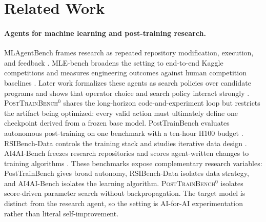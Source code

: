 \documentclass{article}
\newcommand{\bench}{\textsc{PostTrainBench}$^{0}$}
\begin{document}
\section{Related Work}

\paragraph{Agents for machine learning and post-training research.}
MLAgentBench frames research as repeated repository modification, execution, and feedback
\citep{huang2023mlagentbench}. MLE-bench broadens the setting to end-to-end Kaggle
competitions and measures engineering outcomes against human competition baselines
\citep{chan2024mlebench}. Later work formalizes these agents as search policies over
candidate programs and shows that operator choice and search policy interact strongly
\citep{toledo2025airesearchagents}. \bench{} shares the long-horizon code-and-experiment
loop but restricts the artifact being optimized: every valid action must ultimately define
one checkpoint derived from a frozen base model. PostTrainBench evaluates autonomous
post-training on one benchmark with a ten-hour H100 budget \citep{rank2026posttrainbench}.
RSIBench-Data controls the training stack and studies
iterative data design \citep{meng2026rsibenchdata}. AI4AI-Bench freezes research
repositories and scores agent-written changes to training algorithms
\citep{chi2026ai4aibench}. These benchmarks expose complementary research variables:
PostTrainBench gives broad autonomy, RSIBench-Data isolates data strategy, and AI4AI-Bench
isolates the learning algorithm. \bench{} isolates score-driven parameter search without
backpropagation. The target model is distinct from the research agent, so the setting is
AI-for-AI experimentation rather than literal self-improvement.
\end{document}
